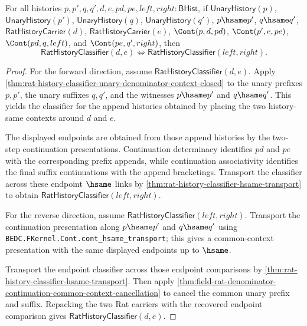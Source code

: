 \begin{theorem}
\label{thm:field-rat-denominator-hsame-matched-context-classifier-exactness}
For all histories
$p,p',q,q',d,e,pd,pe,left,right:\mathsf{BHist}$, if
$\mathsf{UnaryHistory}(p)$, $\mathsf{UnaryHistory}(p')$,
$\mathsf{UnaryHistory}(q)$, $\mathsf{UnaryHistory}(q')$, $p\hsame p'$,
$q\hsame q'$, $\mathsf{RatHistoryCarrier}(d)$,
$\mathsf{RatHistoryCarrier}(e)$, $\Cont(p,d,pd)$, $\Cont(p',e,pe)$,
$\Cont(pd,q,left)$, and $\Cont(pe,q',right)$, then
$$
\mathsf{RatHistoryClassifier}(d,e)
\Longleftrightarrow
\mathsf{RatHistoryClassifier}(left,right).
$$
\end{theorem}
\begin{proof}
For the forward direction, assume $\mathsf{RatHistoryClassifier}(d,e)$.
Apply \autoref{thm:rat-history-classifier-unary-denominator-context-closed}
to the unary prefixes $p,p'$, the unary suffixes $q,q'$, and the witnesses
$p\hsame p'$ and $q\hsame q'$. This yields the classifier for the append
histories obtained by placing the two history-same contexts around $d$ and
$e$.

The displayed endpoints are obtained from those append histories by the
two-step continuation presentations. Continuation determinacy identifies
$pd$ and $pe$ with the corresponding prefix appends, while continuation
associativity identifies the final suffix continuations with the append
bracketings. Transport the classifier across these endpoint $\hsame$ links by
\autoref{thm:rat-history-classifier-hsame-transport} to obtain
$\mathsf{RatHistoryClassifier}(left,right)$.

For the reverse direction, assume
$\mathsf{RatHistoryClassifier}(left,right)$. Transport the continuation
presentation along $p\hsame p'$ and $q\hsame q'$ using
\texttt{BEDC.FKernel.Cont.cont\_hsame\_transport}; this gives a common-context
presentation with the same displayed endpoints up to $\hsame$.

Transport the endpoint classifier across those endpoint comparisons by
\autoref{thm:rat-history-classifier-hsame-transport}. Then apply
\autoref{thm:field-rat-denominator-continuation-common-context-cancellation}
to cancel the common unary prefix and suffix. Repacking the two Rat carriers
with the recovered endpoint comparison gives
$\mathsf{RatHistoryClassifier}(d,e)$.
\end{proof}

